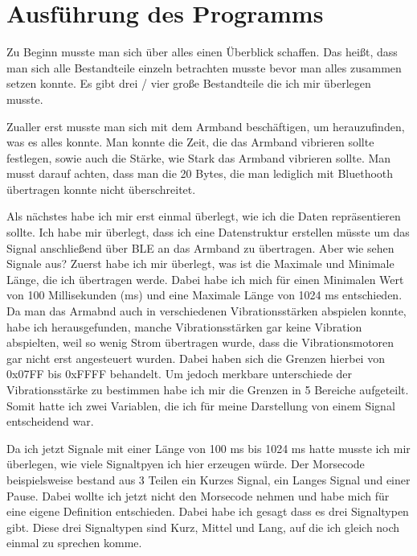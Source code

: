 
\section{Ausführung des Programms}
\label{ch:Entwurf:sec:Ausführung des Programms}

Zu Beginn musste man sich über alles einen Überblick schaffen. 
Das heißt, dass man sich alle Bestandteile einzeln betrachten musste bevor man alles zusammen setzen konnte. 
Es gibt drei / vier große Bestandteile die ich mir überlegen musste.

Zualler erst musste man sich mit dem Armband beschäftigen, um herauzufinden, was es alles konnte. 
Man konnte die Zeit, die das Armband vibrieren sollte festlegen, sowie auch die Stärke, wie Stark das Armband vibrieren sollte. 
Man musst darauf achten, dass man die 20 Bytes, die man lediglich mit Bluethooth übertragen konnte nicht überschreitet.

Als nächstes habe ich mir erst einmal überlegt, wie ich die Daten repräsentieren sollte. Ich habe mir überlegt, dass ich eine Datenstruktur erstellen müsste um das Signal anschließend über BLE an das Armband zu übertragen. Aber wie sehen Signale aus? Zuerst habe ich mir überlegt, was ist die Maximale und Minimale Länge, die ich übertragen werde. Dabei habe ich mich für einen Minimalen Wert von 100 Millisekunden (ms) und eine Maximale Länge von 1024 ms entschieden. Da man das Armabnd auch in verschiedenen Vibrationsstärken abspielen konnte, habe ich herausgefunden, manche Vibrationsstärken gar keine Vibration abspielten, weil so wenig Strom übertragen wurde, dass die Vibrationsmotoren gar nicht erst angesteuert wurden. Dabei haben sich die Grenzen hierbei von 0x07FF bis 0xFFFF behandelt. Um jedoch merkbare unterschiede der Vibrationsstärke zu bestimmen habe ich mir die Grenzen in 5 Bereiche aufgeteilt. 
Somit hatte ich zwei Variablen, die ich für meine Darstellung von einem Signal entscheidend war. 

Da ich jetzt Signale mit einer Länge von 100 ms bis 1024 ms hatte musste ich mir überlegen, wie viele Signaltpyen ich hier erzeugen würde. Der Morsecode beispielsweise bestand aus 3 Teilen ein Kurzes Signal, ein Langes Signal und einer Pause. Dabei wollte ich jetzt nicht den Morsecode nehmen und habe mich für eine eigene Definition entschieden. Dabei habe ich gesagt dass es drei Signaltypen gibt. Diese drei Signaltypen sind Kurz, Mittel und Lang, auf die ich gleich noch einmal zu sprechen komme.


